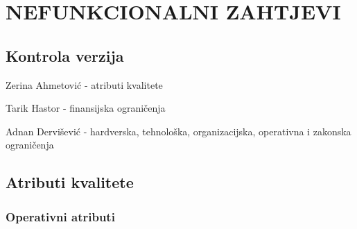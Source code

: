 \sloppy
\chapter{NEFUNKCIONALNI ZAHTJEVI}

\sloppy
\section*{Kontrola verzija}

Zerina Ahmetović - atributi kvalitete

\noindent Tarik Hastor - finansijska ograničenja

\noindent Adnan Dervišević - hardverska, tehnološka, organizacijska, operativna i zakonska ograničenja

\sloppy
\section{Atributi kvalitete}
\sloppy
\subsection{Operativni atributi}

